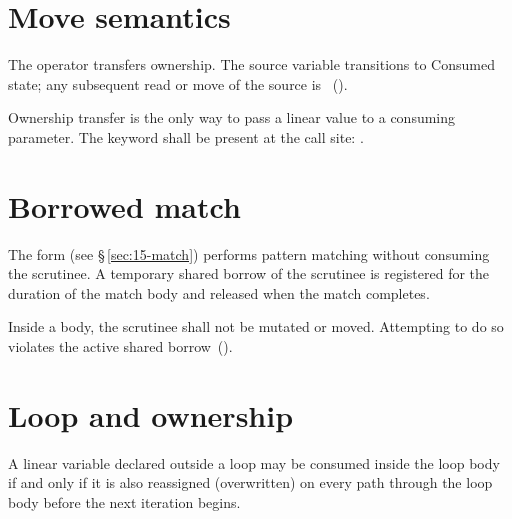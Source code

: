 \begin{example}
\end{example}

\section{Move semantics}
\label{sec:own.move}

\pnum
The  operator transfers ownership.  The source variable
transitions to Consumed state; any subsequent read or move of the source
is \illformed{}~().

\pnum
Ownership transfer is the only way to pass a linear value to a consuming
parameter.  The  keyword shall be present at the call site:
.

\section{Borrowed match}
\label{sec:own.borrowed-match}

\pnum
The  form (see \S\,\ref{sec:15-match}) performs
pattern matching without consuming the scrutinee.  A temporary shared
borrow of the scrutinee is registered for the duration of the match body
and released when the match completes.

\begin{constraint}
  Inside a  body, the scrutinee shall not be mutated
  or moved.  Attempting to do so violates the active shared
  borrow~().
\end{constraint}

\section{Loop and ownership}
\label{sec:own.loop}

\pnum
A linear variable declared outside a loop may be consumed inside the loop
body if and only if it is also reassigned (overwritten) on every path
through the loop body before the next iteration begins.

